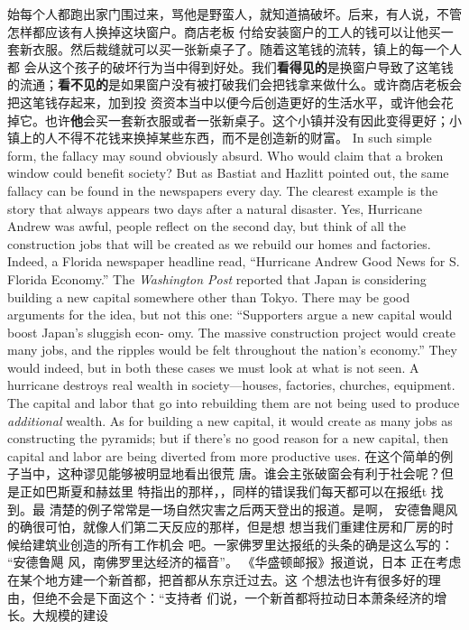 \begin{paracol}{2}
始每个人都跑出家门围过来，骂他是野蛮人，就知道搞破坏。后来，有人说，不管怎样都应该有人换掉这块窗户。商店老板
付给安装窗户的工人的钱可以让他买一套新衣服。然后裁缝就可以买一张新桌子了。随着这笔钱的流转，镇上的每一个人都
会从这个孩子的破坏行为当中得到好处。我们\textbf{看得见的}是换窗户导致了这笔钱的流通；\textbf{看不见的}是如果窗户没有被打破我们会把钱拿来做什么。或许商店老板会把这笔钱存起来，加到投
资资本当中以便今后创造更好的生活水平，或许他会花掉它。也许\textbf{他}会买一套新衣服或者一张新桌子。这个小镇并没有因此变得更好；小镇上的人不得不花钱来换掉某些东西，而不是创造新的财富。
\switchcolumn*
In such simple form, the fallacy may sound obviously absurd.
Who would claim that a broken window could benefit society?
But as Bastiat and Hazlitt pointed out, the same fallacy can be
found in the newspapers every day. The clearest example is the
story that always appears two days after a natural disaster. Yes,
Hurricane Andrew was awful, people reflect on the second day,
but think of all the construction jobs that will be created as we
rebuild our homes and factories. Indeed, a Florida newspaper
headline read, ``Hurricane Andrew Good News for S. Florida
Economy.'' The \textit{Washington Post} reported that Japan is considering building a new capital somewhere other than Tokyo. There
may be good arguments for the idea, but not this one: ``Supporters argue a new capital would boost Japan's sluggish econ-
omy. The massive construction project would create many jobs,
and the ripples would be felt throughout the nation's economy.'' They would indeed, but in both these cases we must look
at what is not seen. A hurricane destroys real wealth in society---houses, factories, churches, equipment. The capital and
labor that go into rebuilding them are not being used to produce \textit{additional} wealth. As for building a new capital, it would
create as many jobs as constructing the pyramids; but if there's
no good reason for a new capital, then capital and labor are
being diverted from more productive uses.
\switchcolumn
在这个简单的例子当中，这种谬见能够被明显地看出很荒
唐。谁会主张破窗会有利于社会呢？但是正如巴斯夏和赫兹里
特指出的那样，，同样的错误我们每天都可以在报纸t 找到。最
清楚的例子常常是一场自然灾害之后两天登出的报道。是啊，
安德鲁飓风的确很可怕，就像人们第二天反应的那样，但是想
想当我们重建住房和厂房的时候给建筑业创造的所有工作机会
吧。一家佛罗里达报纸的头条的确是这么写的： “安德鲁飓
风，南佛罗里达经济的福音”。 《华盛顿邮报》报道说，日本
正在考虑在某个地方建一个新首都，把首都从东京迁过去。这
个想法也许有很多好的理由，但绝不会是下面这个：“支持者
们说，一个新首都将拉动日本萧条经济的增长。大规模的建设

\end{paracol}

